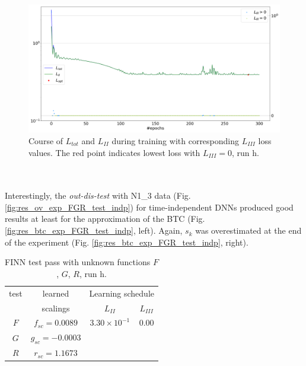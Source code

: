 \begin{figure}[h!]
	\centering
	\includegraphics[width=\textwidth]{images/res_loss_exp_FGR_indp.png}
\caption[Loss, run h]{Course of $L_{tot}$ and $L_{II}$ during training with corresponding $L_{III}$ loss values. The red point indicates lowest loss with $L_{III}=0$, run h.}
\label{fig:res_loss_exp_FGR_indp}
\end{figure}\\
\\
Interestingly, the \textit{out-dis-test} with N1\_3 data (Fig. \ref{fig:res_ov_exp_FGR_test_indp}) for time-independent DNNs produced good results at least for the approximation of the BTC (Fig. \ref{fig:res_btc_exp_FGR_test_indp}, left). Again, $s_k$ was overestimated at the end of the experiment (Fig. \ref{fig:res_btc_exp_FGR_test_indp}, right).
\begin{table}[h!]
    \centering
    \begin{tabular}{c|c||cc}
    test & learned & \multicolumn{2}{c}{Learning schedule}\\
    \quad & scalings & $L_{II}$ & $L_{III}$ \\[0.2 cm] \hline
          $F$ & $f_{sc} = 0.0089$ & $3.30 \times 10^{-1}$ & $ 0.00 $\\
          $G$ & $g_{sc} = -0.0003$ & & \\
          $R$ & $r_{sc} = 1.1673$ & & 
        \end{tabular}
    \caption[FINN testing with unknown time-independent functions $F$, $G$, $R$, run h]{FINN test pass with unknown functions $F$, $G$, $R$, run h.}
    \label{tab:FGR_exp_indp_test}
\end{table}
